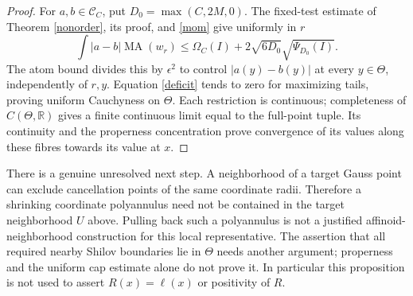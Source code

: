 \documentclass[11pt]{article}
\newcommand{\MA}{\operatorname{MA}}
\newcommand{\C}{\mathcal C}
\newcommand{\R}{\mathbb R}
\begin{document}
\begin{proof}
For $a,b\in\C_C$, put $D_0=\max(C,2M,0)$.
The fixed-test estimate of Theorem \ref{nonorder}, its proof, and
\eqref{mom} give uniformly in $r$
\[
 \int|a-b|\MA(w_r)
 \le\Omega_C(I)+2\sqrt{6D_0}\sqrt{\Psi_{D_0}(I)}.
\]
The atom bound divides this by $\epsilon^2$ to control
$|a(y)-b(y)|$ at every $y\in\Theta$, independently of $r,y$.
Equation \eqref{deficit} tends to zero for maximizing tails, proving
uniform Cauchyness on $\Theta$. Each restriction is continuous;
completeness of $C(\Theta,\R)$ gives a finite continuous limit equal
to the full-point tuple. Its continuity and the properness concentration
prove convergence of its values along these fibres towards its value at $x$.
\end{proof}

There is a genuine unresolved next step. A neighborhood of a target
Gauss point can exclude cancellation points of the same coordinate
radii. Therefore a shrinking coordinate polyannulus need not be
contained in the target neighborhood $U$ above. Pulling back such a
polyannulus is not a justified affinoid-neighborhood construction for
this local representative. The assertion that all required nearby
Shilov boundaries lie in $\Theta$ needs another argument; properness
and the uniform cap estimate alone do not prove it. In particular this
proposition is not used to assert $R(x)=\ell(x)$ or positivity of $R$.
\end{document}
